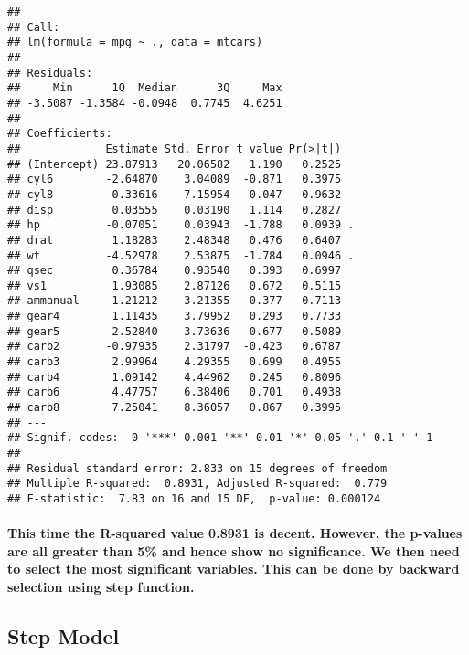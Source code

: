 \documentclass[]{article}
\let\oldparagraph\paragraph
\renewcommand{\paragraph}[1]{\oldparagraph{#1}\mbox{}}
\begin{document}
\begin{verbatim}
## 
## Call:
## lm(formula = mpg ~ ., data = mtcars)
## 
## Residuals:
##     Min      1Q  Median      3Q     Max 
## -3.5087 -1.3584 -0.0948  0.7745  4.6251 
## 
## Coefficients:
##             Estimate Std. Error t value Pr(>|t|)  
## (Intercept) 23.87913   20.06582   1.190   0.2525  
## cyl6        -2.64870    3.04089  -0.871   0.3975  
## cyl8        -0.33616    7.15954  -0.047   0.9632  
## disp         0.03555    0.03190   1.114   0.2827  
## hp          -0.07051    0.03943  -1.788   0.0939 .
## drat         1.18283    2.48348   0.476   0.6407  
## wt          -4.52978    2.53875  -1.784   0.0946 .
## qsec         0.36784    0.93540   0.393   0.6997  
## vs1          1.93085    2.87126   0.672   0.5115  
## ammanual     1.21212    3.21355   0.377   0.7113  
## gear4        1.11435    3.79952   0.293   0.7733  
## gear5        2.52840    3.73636   0.677   0.5089  
## carb2       -0.97935    2.31797  -0.423   0.6787  
## carb3        2.99964    4.29355   0.699   0.4955  
## carb4        1.09142    4.44962   0.245   0.8096  
## carb6        4.47757    6.38406   0.701   0.4938  
## carb8        7.25041    8.36057   0.867   0.3995  
## ---
## Signif. codes:  0 '***' 0.001 '**' 0.01 '*' 0.05 '.' 0.1 ' ' 1
## 
## Residual standard error: 2.833 on 15 degrees of freedom
## Multiple R-squared:  0.8931, Adjusted R-squared:  0.779 
## F-statistic:  7.83 on 16 and 15 DF,  p-value: 0.000124
\end{verbatim}

\hypertarget{this-time-the-r-squared-value-0.8931-is-decent.-however-the-p-values-are-all-greater-than-5-and-hence-show-no-significance.-we-then-need-to-select-the-most-significant-variables.-this-can-be-done-by-backward-selection-using-step-function.}{%
\paragraph{This time the R-squared value 0.8931 is decent. However, the
p-values are all greater than 5\% and hence show no significance. We
then need to select the most significant variables. This can be done by
backward selection using step
function.}\label{this-time-the-r-squared-value-0.8931-is-decent.-however-the-p-values-are-all-greater-than-5-and-hence-show-no-significance.-we-then-need-to-select-the-most-significant-variables.-this-can-be-done-by-backward-selection-using-step-function.}}

\hypertarget{step-model}{%
\subsection{Step Model}\label{step-model}}
\end{document}
